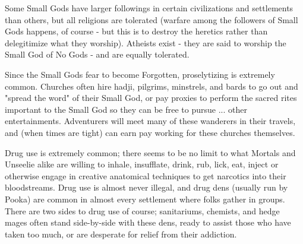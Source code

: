   Some Small Gods have larger followings in certain civilizations and settlements than others, but all religions are tolerated (warfare among the followers of Small Gods happens, of course - but this is to destroy the heretics rather than delegitimize what they worship).  Atheists exist - they are said to worship the Small God of No Gods - and are equally tolerated. 

  Since the Small Gods fear to become Forgotten, proselytizing is extremely common.  Churches often hire hadji, pilgrims, minstrels, and bards to go out and "spread the word" of their Small God, or pay proxies to perform the sacred rites important to the Small God so they can be free to pursue ... other entertainments.  Adventurers will meet many of these wanderers in their travels, and (when times are tight) can earn pay working for these churches themselves.



  
  Drug use is extremely common; there seems to be no limit to what Mortals and Unseelie alike are willing to inhale, insufflate, drink, rub, lick, eat, inject or otherwise engage in creative anatomical techniques to get narcotics into their bloodstreams.  Drug use is almost never illegal, and drug dens (usually run by Pooka) are common in almost every settlement where folks gather in groups.  There are two sides to drug use of course; sanitariums, chemists, and hedge mages often stand side-by-side with these dens, ready to assist those who have taken too much, or are desperate for relief from their addiction.


